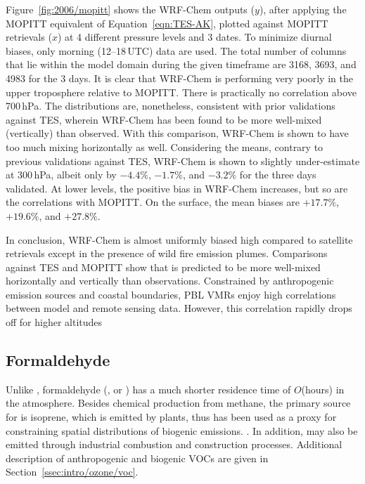 
Figure~\ref{fig:2006/mopitt} shows the WRF-Chem  outputs ($y$), after applying the MOPITT equivalent of Equation~\ref{eqn:TES-AK}, plotted against MOPITT
retrievals ($x$) at 4 different pressure levels and 3 dates. To minimize diurnal biases, only morning (12--18\,\unit{UTC}) data are used. The total number
of columns that lie within the model domain during the given timeframe are 3168, 3693, and 4983 for the 3 days. It is clear that WRF-Chem is performing very poorly in the upper troposphere relative
to MOPITT. There is practically no correlation above 700\,\unit{hPa}. The distributions are, nonetheless, consistent with prior validations against TES, wherein WRF-Chem
 has been found to be more well-mixed (vertically) than observed. With this comparison, WRF-Chem is shown to have too much mixing horizontally as well.
Considering the means, contrary to previous validations against TES, WRF-Chem is shown to slightly under-estimate  at 300\,\unit{hPa}, albeit
only by $-4.4\%$, $-1.7\%$, and $-3.2\%$ for the three days validated. At lower levels, the positive bias in WRF-Chem increases, but so are the correlations with MOPITT. On the
surface, the mean biases are $+17.7\%$, $+19.6\%$, and $+27.8\%$.

In conclusion, WRF-Chem  is almost uniformly biased high compared to satellite retrievals except in the presence of wild fire emission plumes. Comparisons against
TES and MOPITT show that  is predicted to be more well-mixed horizontally and vertically than observations. Constrained by anthropogenic emission sources and coastal boundaries,
PBL  VMRs enjoy high correlations between model and remote sensing data. However, this correlation rapidly drops off for higher altitudes

\subsection{Formaldehyde}\label{ssec:2006/gen/form}

Unlike , formaldehyde (, or ) has a much shorter residence time of $O$(hours) in the atmosphere. Besides chemical production
from methane, the primary source for  is isoprene, which
is emitted by plants, thus  has been used as a proxy for constraining spatial distributions of biogenic emissions. \citep[e.g.][]{Palmer:2006qf,Millet:2008oq,Marais:2012kl}.
In addition,  may also be emitted through industrial combustion and construction processes. Additional description of anthropogenic and biogenic VOCs are given
in Section~\ref{ssec:intro/ozone/voc}.

